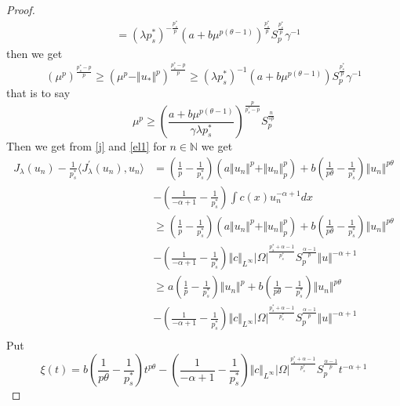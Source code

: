 \documentclass[10pt,twoside,reqno,centertags,draft]{amsart}
\begin{document}
\begin{proof}
\begin{equation*}
\begin{aligned}
 & = (\lambda p_s^*)^{-\frac{p_s^*}{p}}(a +b\mu^{p(\theta -1)})^{\frac{p_s^*}{p}}S_{p}^{\frac{p_s^*}{p}}\gamma^{-1}
 \end{aligned}
\end{equation*}
then we get
\begin{equation*}
\left(\mu^{p}\right)^{\frac{p_s^* -p}{p}} \geq (\mu^{p} -\Vert u_*\Vert^{p})^{\frac{p_s^* -p}{p}} \geq (\lambda p_s^*)^{-1}(a +b\mu^{p(\theta -1)})S_{p}^{\frac{p_s^* }{p}}\gamma^{-1}
\end{equation*}
that is to say
\begin{equation}\label{e031}
\mu^{p} \geq \left(\frac{a +b\mu^{p(\theta -1)}}{\gamma \lambda p_s^*}\right)^{\frac{p}{p_s^* -p}}S_{p}^{\frac{n}{s p}}
\end{equation}
Then we get from \ref{j} and \ref{el1} for $ n \in \mathbb{N}$ we get
\begin{equation*}
\begin{aligned}
J_{\lambda}(u_n) -\frac{1}{p_s^*}\langle J^{\prime}_{\lambda}(u_n), u_n\rangle & =\left( \frac{1}{p} -\frac{1}{p_s^*}\right)\left(a \Vert u_n\Vert^p + \Vert u_n \Vert^{p}_{p}\right) +b\left( \frac{1}{p\theta} -\frac{1}{p_s^*}\right)\Vert u_n \Vert^{p \theta} \\
& -\left( \frac{1}{-\alpha +1} -\frac{1}{p_s^*}\right)\int c(x) u_n^{-\alpha+1}dx\\
&\geq \left( \frac{1}{p} -\frac{1}{p_s^*}\right)\left(a \Vert u_n\Vert^p + \Vert u_n \Vert^{p}_{p}\right) +b\left( \frac{1}{p\theta} -\frac{1}{p_s^*}\right)\Vert u_n \Vert^{p \theta} \\
& -\left( \frac{1}{-\alpha +1} -\frac{1}{p_s^*}\right)\Vert c \Vert_{L^{\infty}}\vert \Omega\vert^{\frac{p_s^* +\alpha -1}{p_s^*}}S_{p}^{\frac{\alpha-1}{p}} \Vert u \Vert^{-\alpha+1}\\
&\geq a\left( \frac{1}{p} -\frac{1}{p_s^*}\right)\Vert u_n\Vert^p +b\left( \frac{1}{p\theta} -\frac{1}{p_s^*}\right)\Vert u_n \Vert^{p \theta} \\
& -\left( \frac{1}{-\alpha +1} -\frac{1}{p_s^*}\right)\Vert c \Vert_{L^{\infty}}\vert \Omega\vert^{\frac{p_s^* +\alpha -1}{p_s^*}}S_{p}^{\frac{\alpha-1}{p}} \Vert u \Vert^{-\alpha+1}\\
\end{aligned}
\end{equation*}
Put 
\begin{equation*}
\xi(t) =b\left( \frac{1}{p\theta} -\frac{1}{p_s^*}\right)t^{p \theta} 
 -\left( \frac{1}{-\alpha +1} -\frac{1}{p_s^*}\right)\Vert c \Vert_{L^{\infty}}\vert \Omega\vert^{\frac{p_s^* +\alpha -1}{p_s^*}}S_{p}^{\frac{\alpha-1}{p}} t^{-\alpha+1}

\end{equation*}
\end{proof}
\end{document}
